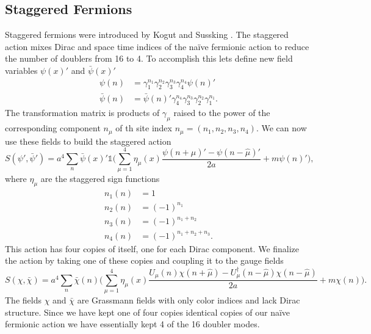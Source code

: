 \subsection{Staggered Fermions}

Staggered fermions were introduced by Kogut and Sussking \cite{PhysRevD.11.395}.
The staggered action mixes Dirac and space time indices of the naïve fermionic action to reduce the number of doublers from 16 to 4.
To accomplish this lets define new field variables $\psi(x)'$ and $\bar{\psi}(x)'$
\begin{equation}
  \begin{aligned}
    \psi(n)&=\gamma_1^{n_1}\gamma_2^{n_2}\gamma_3^{n_3}\gamma_4^{n_4}\psi(n)'\\
    \bar{\psi}(n)&=\bar{\psi}(n)'\gamma_4^{n_4}\gamma_3^{n_3}\gamma_2^{n_2}\gamma_1^{n_1}.
  \end{aligned}
\end{equation}
The transformation matrix is products of $\gamma_\mu$ raised to the power of the corresponding component $n_\mu$ of th site index $n_\mu=(n_1,n_2,n_3,n_4)$.
We can now use these fields to build the staggered action
\begin{equation}
  S(\psi',\bar{\psi}')=a^4\sum_n \bar{\psi}(x)'\mathbb{1}\Big(\sum_{\mu=1}^4\eta_\mu(x)\frac{\psi(n+\hat{\mu})'-\psi(n-\hat{\mu})'}{2a}+m\psi(n)'\Big),
\end{equation}
where $\eta_\mu$ are the staggered sign functions
\begin{equation}
  \begin{aligned}
    n_1(n)&=1 \\
    n_2(n)&=(-1)^{n_1} \\
    n_3(n)&=(-1)^{n_1+n_2} \\
    n_4(n)&=(-1)^{n_1+n_2+n_3}.
  \end{aligned}
\end{equation}
This action has four copies of itself, one for each Dirac component.
We finalize the action by taking one of these copies and coupling it to the gauge fields
\begin{equation}
  S(\chi,\bar{\chi})=a^4\sum_n \bar{\chi}(n)\Big(\sum_{\mu=1}^4\eta_\mu(x)\frac{U_\mu(n)\chi(n+\hat{\mu})-U_\mu^\dagger(n-\hat{\mu})\chi(n-\hat{\mu})}{2a}+m\chi(n)\Big).
\end{equation}
The fields $\chi$ and $\bar{\chi}$ are Grassmann fields with only color indices and lack Dirac structure.
Since we have kept one of four copies identical copies of our naïve fermionic action we have essentially kept 4 of the 16 doubler modes.
